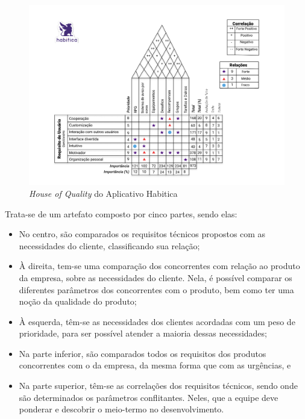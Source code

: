 \begin{figure}[]
    \begin{center}
        \caption{\textit{House of Quality} do Aplicativo Habitica}
        \label{fig:hoq}
        \includegraphics[scale=0.58]{figuras/referencial_teorico/HOQ.jpg}
    \end{center}
\end{figure}

Trata-se de um artefato composto por cinco partes, sendo elas:

\begin{itemize}
    \item No centro, são comparados os requisitos técnicos propostos com as necessidades do cliente, classificando sua relação;
    \item À direita, tem-se uma comparação dos concorrentes com relação ao produto da empresa, sobre as necessidades do cliente. Nela, é possível comparar os diferentes parâmetros dos concorrentes com o produto, bem como ter uma noção da qualidade do produto;
    \item À esquerda, têm-se as necessidades dos clientes acordadas com um peso de prioridade, para ser possível atender a maioria dessas necessidades;
    \item Na parte inferior, são comparados todos os requisitos dos produtos concorrentes com o da empresa, da mesma forma que com as urgências, e
    \item Na parte superior, têm-se as correlações dos requisitos técnicos, sendo onde são determinados os parâmetros conflitantes. Neles, que a equipe deve ponderar e descobrir o meio-termo no desenvolvimento.
\end{itemize}

